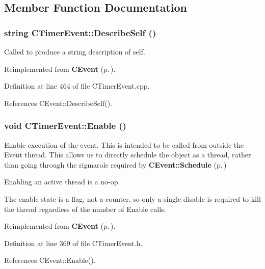 \subsection{Member Function Documentation}
\subsubsection{\setlength{\rightskip}{0pt plus 5cm}string CTimer\-Event::Describe\-Self ()\hspace{0.3cm}{\tt  [virtual]}}\label{classCTimerEvent_a12}


Called to produce a string description of self. 

Reimplemented from {\bf CEvent} {\rm (p.\,\pageref{classCEvent_a16})}.

Definition at line 464 of file CTimer\-Event.cpp.

References CEvent::Describe\-Self().
\subsubsection{\setlength{\rightskip}{0pt plus 5cm}void CTimer\-Event::Enable ()\hspace{0.3cm}{\tt  [inline]}}\label{classCTimerEvent_a7}


Enable execution of the event. This is intended to be called from outside the Event thread. This allows us to directly schedule the object as a thread, rather than going through the rigmarole required by {\bf CEvent::Schedule} {\rm (p.\,\pageref{classCEvent_b3})}

\begin{CompactItemize}
\item 
Enabling an active thread is a no-op.\item 
The enable state is a flag, not a counter, so only a single disable is required to kill the thread regardless of the number of Enable calls. \end{CompactItemize}


Reimplemented from {\bf CEvent} {\rm (p.\,\pageref{classCEvent_a11})}.

Definition at line 369 of file CTimer\-Event.h.

References CEvent::Enable().

